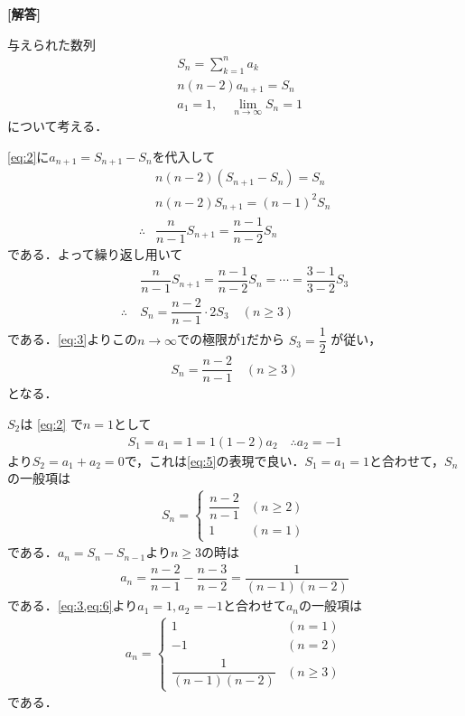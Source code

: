\documentclass[../../main.tex]{subfiles}
\begin{document}
\begin{oframed}
  
\end{oframed}

{\bf [解答]}

与えられた数列
\begin{align}
  & S_n = \sum_{k=1}^{n}a_k \label{eq:1}\\
  & n(n-2)a_{n+1}=S_n \label{eq:2}\\
  & a_1 = 1, \quad \lim_{n\to\infty}S_n = 1 \label{eq:3}
\end{align}
について考える．

\cref{eq:2}に$a_{n+1}=S_{n+1}-S_{n}$を代入して
\begin{align}
  & n(n-2)(S_{n+1}-S_n)=S_n\\
  & n(n-2)S_{n+1}=(n-1)^2S_n \\
  \therefore
  & \dfrac{n}{n-1}S_{n+1} = \dfrac{n-1}{n-2}S_n \label{eq:4}
\end{align}
である．よって繰り返し用いて
\begin{align}
  & \dfrac{n}{n-1}S_{n+1}=\dfrac{n-1}{n-2}S_n=\cdots=\dfrac{3-1}{3-2}S_3 \\
  \therefore\
  & S_n=\dfrac{n-2}{n-1}\cdot 2S_3\quad(n\ge3)
\end{align}
である．\cref{eq:3}よりこの$n\to\infty$での極限が$1$だから $S_3 = \dfrac{1}{2}$ が従い，
\begin{align}
  S_n=\dfrac{n-2}{n-1} \quad(n\ge 3) \label{eq:5}
\end{align}
となる．

$S_2$は \cref{eq:2} で$n=1$として
\begin{align}
  S_1 = a_1 = 1 = 1(1-2)a_2
  \quad \therefore
  a_2 = -1 \label{eq:6}
\end{align}
より$S_2 = a_1+a_2 = 0$で，これは\cref{eq:5}の表現で良い．$S_1=a_1=1$と合わせて，$S_n$の一般項は
\begin{align}
  S_n =
  \begin{cases}
    \dfrac{n-2}{n-1} & (n \ge 2) \\
    1 & (n = 1)
  \end{cases}
\end{align}
である．$a_n=S_{n}-S_{n-1}$より$n \ge 3$の時は
\begin{align}
  a_n = \dfrac{n-2}{n-1} - \dfrac{n-3}{n-2} = \dfrac{1}{(n-1)(n-2)}
\end{align}
である．\cref{eq:3,eq:6}より$a_1=1,a_2=-1$と合わせて$a_n$の一般項は
\begin{align}
  a_n=
  \begin{cases}
    1&(n=1)\\
    -1&(n=2)\\
    \dfrac{1}{(n-1)(n-2)}&(n\ge3)
  \end{cases}
\end{align}
である．

\newpage
\end{document}

